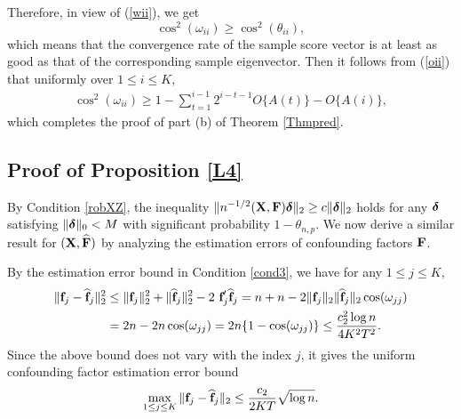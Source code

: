 \documentclass{statsoc}
\newcommand{\bff}{\mbox{\bf f}}
\newcommand{\bF}{\mbox{\bf F}}
\newcommand{\bX}{\mbox{\bf X}}
\newcommand{\bdelta}{\mbox{\boldmath $\delta$}}
\begin{document}
Therefore, in view of (\ref{wii}), we get
\[\cos^2(\omega_{ii}) \geq \cos^2(\theta_{ii}),\]
which means that the convergence rate of the sample score vector is at least as good as that of the corresponding sample eigenvector. Then it follows from (\ref{oii}) that uniformly over $1 \leq i \leq K$,
\begin{align*}
\cos^2(\omega_{ii}) \geq 1 - \sum_{t = 1}^{i - 1} 2^{i - t - 1} O\{A(t)\} - O\{A(i)\},
\end{align*}
which completes the proof of part (b) of Theorem \ref{Thmpred}.

\subsection{Proof of Proposition \ref{L4}}

\smallskip

By Condition \ref{robXZ}, the inequality $\|n^{-1/2}(\bX, \bF) \bdelta\|_2 \geq c \|\bdelta\|_2$ holds for any $\bdelta$ satisfying $\|\bdelta\|_0 < M$ with significant probability $1 - \theta_{n,p}$. We now derive a similar result for $(\bX, \widehat{\bF})$ by analyzing the estimation errors of confounding factors $\bF$.

By the estimation error bound in Condition \ref{cond3}, we have for any $1 \leq j \leq K$,
\begin{align*}
\|\bff_j - \widehat{\bff}_j\|_2^2 & \leq \|\bff_j\|_2^2 + \|\widehat{\bff}_j\|_2^2 - 2 \ \bff_j' \widehat{\bff}_j = n + n - 2 \|\bff_j\|_2 \|\widehat{\bff}_j\|_2 \cos (\omega_{jj}) \\
& = 2n - 2n \cos (\omega_{jj}) = 2n \{1 - \cos (\omega_{jj})\} \leq \frac{c_2^2 \log n}{4 K^2 T^2}.
\end{align*}
Since the above bound does not vary with the index $j$, it gives the uniform confounding factor estimation error bound
\begin{equation}\label{pree}
\max_{1 \leq j \leq K}\|\bff_j - \widehat{\bff}_j\|_2 \leq \frac{c_2}{2K T}\sqrt{\log n}.
\end{equation}
\end{document}
